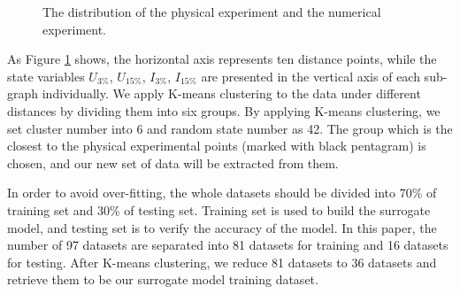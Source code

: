 \begin{figure}[htbp]
{}
\caption{The distribution of the physical experiment and the numerical experiment.}
\label{fig:clustering}
\end{figure}

As Figure \ref{fig:clustering} shows, the horizontal axis represents ten distance points, while the state variables $U_{3{\%}}$, $U_{15{\%}}$, $I_{3{\%}}$, $I_{15{\%}}$ are presented in the vertical axis of each sub-graph individually. We apply K-means clustering to the data under different distances by dividing them into six groups. By applying K-means clustering, we set cluster number into 6 and random state number as 42. The group which is the closest to the physical experimental points (marked with black pentagram) is chosen, and our new set of data will be extracted from them. 

In order to avoid over-fitting, the whole datasets should be divided into 70{\%} of training set and 30{\%} of testing set. Training set is used to build the surrogate model, and testing set is to verify the accuracy of the model. In this paper, the number of 97 datasets are separated into 81 datasets for training and 16 datasets for testing. After K-means clustering, we reduce 81 datasets to 36 datasets and retrieve them to be our surrogate model training dataset.

